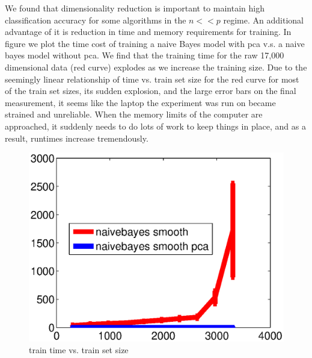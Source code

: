 	We found that dimensionality reduction is important to maintain high classification accuracy for some algorithms in the $n << p$ regime. An additional advantage of it is reduction in time and memory requirements for training. In figure \label{fig:timecompare} we plot the time cost of training a naive Bayes model with pca v.s. a naive bayes model without pca. We find that the training time for the raw 17,000 dimensional data (red curve) explodes as we increase the training size. Due to the seemingly linear relationship of time vs. train set size for the red curve for most of the train set sizes, its sudden explosion, and the large error bars on the final measurement, it seems like the laptop the experiment was run on became strained and unreliable. When the memory limits of the computer are approached, it suddenly needs to do lots of work to keep things in place, and as a result, runtimes increase tremendously. 

\begin{center}
\begin{figure}[!ht]
\centering
\includegraphics[width=.7\textwidth]{../images/_naivebayes_smooth_naivebayes_smooth_pca_time.eps}
\caption{train time vs. train set size}
\label{fig:timecompare}
\end{figure}
\end{center}


% 

